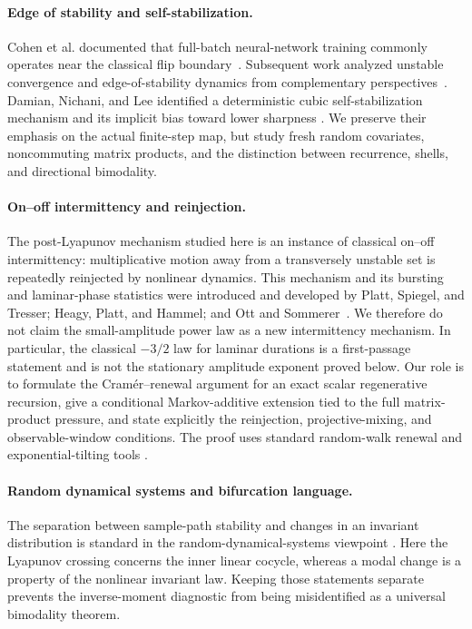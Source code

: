 \documentclass[11pt]{article}
\theoremstyle{definition}
\begin{document}
\paragraph{Edge of stability and self-stabilization.}
Cohen et al. documented that full-batch neural-network training commonly
operates near the classical flip boundary~\cite{CohenEtAl2021}.  Subsequent
work analyzed unstable convergence and edge-of-stability dynamics from
complementary perspectives~\cite{AhnZhangSra2022,AroraLiPanigrahi2022}.
Damian, Nichani, and Lee identified a deterministic cubic self-stabilization
mechanism and its implicit bias toward lower sharpness
\cite{DamianNichaniLee2023}.  We preserve their emphasis on the actual
finite-step map, but study fresh random covariates, noncommuting matrix
products, and the distinction between recurrence, shells, and directional
bimodality.

\paragraph{On--off intermittency and reinjection.}
The post-Lyapunov mechanism studied here is an instance of classical
on--off intermittency: multiplicative motion away from a transversely
unstable set is repeatedly reinjected by nonlinear dynamics.  This mechanism
and its bursting and laminar-phase statistics were introduced and developed
by Platt, Spiegel, and Tresser; Heagy, Platt, and Hammel; and Ott and
Sommerer~\cite{PlattSpiegelTresser1993,HeagyPlattHammel1994,OttSommerer1994}.
We therefore do not claim the small-amplitude power law as a new
intermittency mechanism.  In particular, the classical $-3/2$ law for
laminar durations is a first-passage statement and is not the stationary
amplitude exponent proved below.  Our role is to formulate the Cram\'er--renewal
argument for an exact scalar regenerative recursion, give a conditional
Markov-additive extension tied to the full matrix-product pressure, and state
explicitly the reinjection, projective-mixing, and observable-window
conditions.  The proof uses standard
random-walk renewal and exponential-tilting tools
\cite{Asmussen2003,NeyNummelin1987I,NeyNummelin1987II}.

\paragraph{Random dynamical systems and bifurcation language.}
The separation between sample-path stability and changes in an invariant
distribution is standard in the random-dynamical-systems viewpoint
\cite{Arnold1998}.  Here the Lyapunov crossing concerns the inner linear
cocycle, whereas a modal change is a property of the nonlinear invariant law.
Keeping those statements separate prevents the inverse-moment diagnostic
from being misidentified as a universal bimodality theorem.
\end{document}
